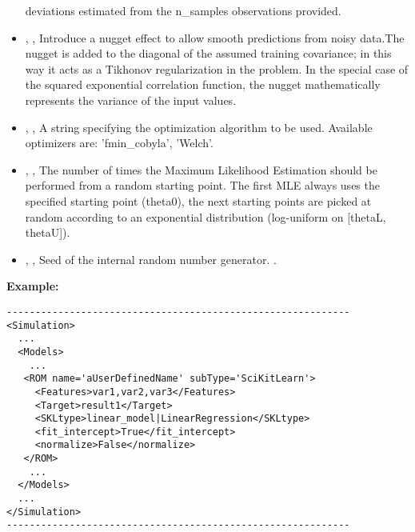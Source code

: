 \begin{itemize}
  deviations estimated from the n\_samples observations provided.
  \item {} , ,
  Introduce a nugget effect to allow smooth predictions from noisy data.The
  nugget is added to the diagonal of the assumed training covariance; in this
  way it acts as a Tikhonov regularization in the problem.
  In the special case of the squared exponential correlation function, the
  nugget mathematically represents the variance of the input values.
  \item {} , ,
  A string specifying the optimization algorithm to be used.
  Available optimizers are: 'fmin\_cobyla', 'Welch'.
  \item {} , ,
  The number of times the Maximum Likelihood Estimation should be performed from
  a random starting point.
  The first MLE always uses the specified starting point (theta0), the next
  starting points are picked at random according to an exponential distribution
  (log-uniform on [thetaL, thetaU]).
  \item {} , ,
  Seed of the internal random number generator.
  .
\end{itemize}

\textbf{Example:}
\begin{lstlisting}[style=XML]
------------------------------------------------------------
<Simulation>
  ...
  <Models>
    ...
   <ROM name='aUserDefinedName' subType='SciKitLearn'>
     <Features>var1,var2,var3</Features>
     <Target>result1</Target>
     <SKLtype>linear_model|LinearRegression</SKLtype>
     <fit_intercept>True</fit_intercept>
     <normalize>False</normalize>
   </ROM>
    ...
  </Models>
  ...
</Simulation>
------------------------------------------------------------
\end{lstlisting}


